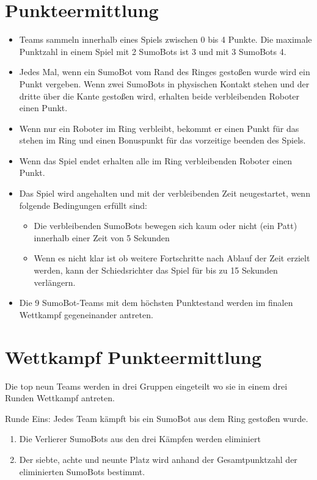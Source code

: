 \documentclass[a4paper,12pt]{article}
\begin{document}
\section{Punkteermittlung}
\begin{itemize}
	\item Teams sammeln innerhalb eines Spiels zwischen 0 bis 4 Punkte. Die maximale Punktzahl in einem Spiel mit 2 SumoBots ist 3 und mit 3 SumoBots 4.
	\item Jedes Mal, wenn ein SumoBot vom Rand des Ringes gestoßen wurde wird ein Punkt vergeben. Wenn zwei SumoBots in physischen Kontakt stehen und der dritte über die Kante gestoßen wird, erhalten beide verbleibenden Roboter einen Punkt.
	\item Wenn nur ein Roboter im Ring verbleibt, bekommt er einen Punkt für das stehen im Ring und einen Bonuspunkt für das vorzeitige beenden des Spiels.
	\item Wenn das Spiel endet erhalten alle im Ring verbleibenden Roboter einen Punkt.
	\item Das Spiel wird angehalten und mit der verbleibenden Zeit neugestartet, wenn folgende Bedingungen erfüllt sind:
	\begin{itemize}
		\item Die verbleibenden SumoBots bewegen sich kaum oder nicht (ein Patt) innerhalb einer Zeit von 5 Sekunden
		\item Wenn es nicht klar ist ob weitere Fortschritte nach Ablauf der Zeit erzielt werden, kann der Schiedsrichter das Spiel für bis zu 15 Sekunden verlängern.
	\end{itemize}
	\item Die 9 SumoBot-Teams mit dem höchsten Punktestand werden im finalen Wettkampf gegeneinander antreten.
\end{itemize}

\section{Wettkampf Punkteermittlung}

Die top neun Teams werden in drei Gruppen eingeteilt wo sie in einem drei Runden Wettkampf antreten.

Runde Eins: Jedes Team kämpft bis ein SumoBot aus dem Ring gestoßen wurde.
\begin{enumerate}
	\item  Die Verlierer SumoBots aus den drei Kämpfen werden eliminiert
	\item  Der siebte, achte und neunte Platz wird anhand der Gesamtpunktzahl der eliminierten SumoBots bestimmt.
\end{enumerate}
\end{document}
